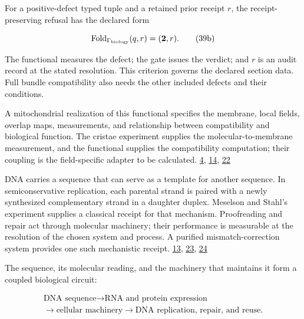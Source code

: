 For a positive-defect typed tuple and a retained prior receipt \(r\), the receipt-preserving refusal has the declared form

\[
\operatorname{Fold}_{\Gamma_{\rm biology}}(q,r)=(\mathbf2,r).
\tag{39b}
\]

The functional measures the defect; the gate issues the verdict; and \(r\) is an audit record at the stated resolution. This criterion governs the declared section data. Full bundle compatibility also needs the other included defects and their conditions.

A mitochondrial realization of this functional specifies the membrane, local fields, overlap maps, measurements, and relationship between compatibility and biological function. The cristae experiment supplies the molecular-to-membrane measurement, and the functional supplies the compatibility computation; their coupling is the field-specific adapter to be calculated. \href{https://github.com/Coppalini-Architecture/coppalini-architecture/blob/9b7122ca5c3712c2c294e2bc5097276d0ba9817b/papers/motion-and-difference/motion-and-difference-2026-07-17.pdf}{4}, \href{https://chatgpt.com/library?file_id=libfile_c45a658f83988191a4057b320f6b5048\&account_id=personal}{14}, \href{https://doi.org/10.1073/pnas.1816556116}{22}

DNA carries a sequence that can serve as a template for another sequence. In semiconservative replication, each parental strand is paired with a newly synthesized complementary strand in a daughter duplex. Meselson and Stahl's experiment supplies a classical receipt for that mechanism. Proofreading and repair act through molecular machinery; their performance is measurable at the resolution of the chosen system and process. A purified mismatch-correction system provides one such mechanistic receipt. \href{https://github.com/Coppalini-Architecture/coppalini-architecture/blob/9b7122ca5c3712c2c294e2bc5097276d0ba9817b/papers/14\%20DNA_REPLICATION_REPAIR_EXPRESSION_HEREDITARY_MEMORY_v0_1.md}{13}, \href{https://doi.org/10.1073/pnas.44.7.671}{23}, \href{https://doi.org/10.1126/science.2665076}{24}

The sequence, its molecular reading, and the machinery that maintains it form a coupled biological circuit:

\[
\begin{gathered}
\text{DNA sequence}
\longrightarrow
\text{RNA and protein expression}
\\[-1pt]
\longrightarrow
\text{cellular machinery}
\longrightarrow
\text{DNA replication, repair, and reuse}.
\end{gathered}
\tag{40}
\]

